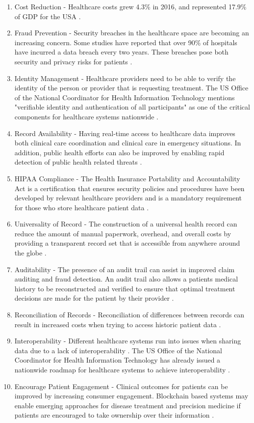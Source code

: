 \documentclass[12pt]{report}
\begin{document}
\begin{enumerate}[label=(\alph*)]
\item Cost Reduction - Healthcare costs grew 4.3\% in 2016, and represented 17.9\% of GDP for the USA \cite{CMSgov.}.
\item Fraud Prevention - Security breaches in the healthcare space are becoming an increasing concern. Some studies have reported that over 90\% of hospitals have incurred a data breach every two years. These breaches pose both security and privacy risks for patients \cite{KupwadePatil.2014}.
\item Identity Management - Healthcare providers need to be able to verify the identity of the person or provider that is requesting treatment. The US Office of the National Coordinator for Health Information Technology mentions "verifiable identity and authentication of all participants" as one of the critical components for healthcare systems nationwide \cite{Rabah.2017}.
\item Record Availability - Having real-time access to healthcare data improves both clinical care coordination and clinical care in emergency situations. In addition, public health efforts can also be improved by enabling rapid detection of public health related threats \cite{Kuo.2017}.
\item HIPAA Compliance - The Health Insurance Portability and Accountability Act is a certification that ensures security policies and procedures have been developed by relevant healthcare providers and is a mandatory requirement for those who store healthcare patient data \cite{HIPAA.}.
\item Universality of Record - The construction of a universal health record can reduce the amount of manual paperwork, overhead, and overall costs by providing a transparent record set that is accessible from anywhere around the globe \cite{Rabah.2017}.
\item Auditability - The presence of an audit trail can assist in improved claim auditing and fraud detection. An audit trail also allows a patients medical history to be reconstructed and verified to ensure that optimal treatment decisions are made for the patient by their provider \cite{Kuo.2017}.
\item Reconciliation of Records - Reconciliation of differences between records can result in increased costs when trying to access historic patient data \cite{Rabah.2017}.
\item Interoperability - Different healthcare systems run into issues when sharing data due to a lack of interoperability \cite{Azaria.2016}. The US Office of the National Coordinator for Health Information Technology has already issued a nationwide roadmap for healthcare systems to achieve interoperability \cite{Rabah.2017}.
\item Encourage Patient Engagement - Clinical outcomes for patients can be improved by increasing consumer engagement. Blockchain based systems may enable emerging approaches for disease treatment and precision medicine if patients are encouraged to take ownership over their information \cite{IBMGlobalBusinessServicesPublicSectorTeam.2016}.
\end{enumerate}
\end{document}
